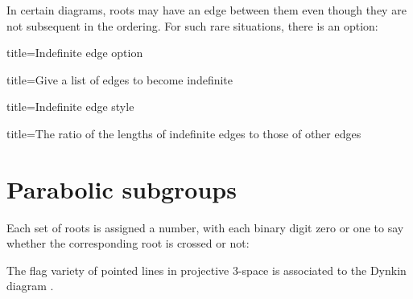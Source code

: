 \documentclass{amsart}
\begin{document}
In certain diagrams, roots may have an edge between them even though they are not subsequent in the ordering.
For such rare situations, there is an option:
\begin{tcblisting}{title={Indefinite edge option}}
\end{tcblisting}
\begin{tcblisting}{title={Give a list of edges to become indefinite}}
\end{tcblisting}

\begin{tcblisting}{title={Indefinite edge style}}
\end{tcblisting}

\begin{tcblisting}{title={The ratio of the lengths of indefinite edges to those of other edges}}
\end{tcblisting}


\section{Parabolic subgroups}

Each set of roots is assigned a number, with each binary digit zero or one to say whether the corresponding root is crossed or not:
\begin{tcblisting}{}
The flag variety of pointed lines in 
projective 3-space is associated to 
the Dynkin diagram .
\end{tcblisting}
\end{document}
